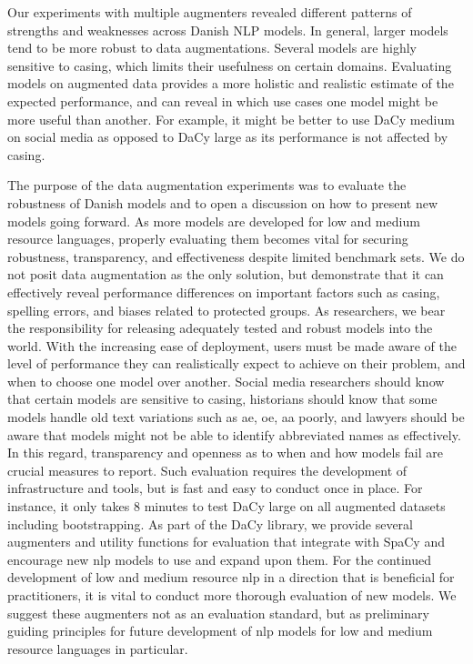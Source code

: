 \documentclass{article}
\begin{document}
Our experiments with multiple augmenters revealed different patterns of strengths and weaknesses across Danish NLP models. In general, larger models tend to be more robust to data augmentations. Several models are highly sensitive to casing, which limits their usefulness on certain domains. Evaluating models on augmented data provides a more holistic and realistic estimate of the expected performance, and can reveal in which use cases one model might be more useful than another. For example, it might be better to use DaCy medium on social media as opposed to DaCy large as its performance is not affected by casing. 

The purpose of the data augmentation experiments was to evaluate the robustness of Danish models and to open a discussion on how to present new models going forward. As more models are developed for low and medium resource languages, properly evaluating them becomes vital for securing robustness, transparency, and effectiveness despite limited benchmark sets. We do not posit data augmentation as the only solution, but demonstrate that it can effectively reveal performance differences on important factors such as casing, spelling errors, and biases related to protected groups. As researchers, we bear the responsibility for releasing adequately tested and robust models into the world. With the increasing ease of deployment, users must be made aware of the level of performance they can realistically expect to achieve on their problem, and when to choose one model over another. Social media researchers should know that certain models are sensitive to casing, historians should know that some models handle old text variations such as ae, oe, aa poorly, and lawyers should be aware that models might not be able to identify abbreviated names as effectively. In this regard, transparency and openness as to when and how models fail are crucial measures to report. Such evaluation requires the development of infrastructure and tools, but is fast and easy to conduct once in place. For instance, it only takes 8 minutes to test DaCy large on all augmented datasets including bootstrapping. As part of the DaCy library, we provide several augmenters and utility functions for evaluation that integrate with SpaCy and encourage new \gls{nlp} models to use and expand upon them. For the continued development of low and medium resource \gls{nlp} in a direction that is beneficial for practitioners, it is vital to conduct more thorough evaluation of new models. We suggest these augmenters not as an evaluation standard, but as preliminary guiding principles for future development of \gls{nlp} models for low and medium resource languages in particular. 
 
\printglossary[style=mcolindex, title=Abbreviations,nonumberlist]






\printbibliography
\end{document}

